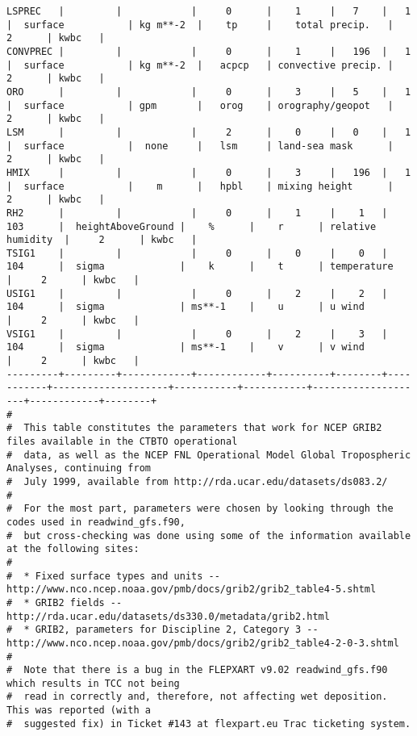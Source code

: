\documentclass{egu}                  %
\begin{document}
\begin{landscape}
\begin{scriptsize}
\begin{verbatim}
LSPREC   |         |            |     0      |    1     |   7    |   1       |  surface           | kg m**-2  |    tp     |    total precip.   |     2      | kwbc   |
CONVPREC |         |            |     0      |    1     |   196  |   1       |  surface           | kg m**-2  |   acpcp   | convective precip. |     2      | kwbc   |
ORO      |         |            |     0      |    3     |   5    |   1       |  surface           | gpm       |   orog    | orography/geopot   |     2      | kwbc   |
LSM      |         |            |     2      |    0     |   0    |   1       |  surface           |  none     |   lsm     | land-sea mask      |     2      | kwbc   |
HMIX     |         |            |     0      |    3     |   196  |   1       |  surface           |    m      |   hpbl    | mixing height      |     2      | kwbc   |
RH2      |         |            |     0      |    1     |    1   |  103      |  heightAboveGround |    %      |    r      | relative humidity  |     2      | kwbc   |
TSIG1    |         |            |     0      |    0     |    0   |  104      |  sigma             |    k      |    t      | temperature        |     2      | kwbc   |
USIG1    |         |            |     0      |    2     |    2   |  104      |  sigma             | ms**-1    |    u      | u wind             |     2      | kwbc   |
VSIG1    |         |            |     0      |    2     |    3   |  104      |  sigma             | ms**-1    |    v      | v wind             |     2      | kwbc   |
---------+---------+------------+------------+----------+--------+-----------+--------------------+-----------+-----------+--------------------+------------+--------+
#
#  This table constitutes the parameters that work for NCEP GRIB2 files available in the CTBTO operational
#  data, as well as the NCEP FNL Operational Model Global Tropospheric Analyses, continuing from
#  July 1999, available from http://rda.ucar.edu/datasets/ds083.2/
#
#  For the most part, parameters were chosen by looking through the codes used in readwind_gfs.f90,
#  but cross-checking was done using some of the information available at the following sites:
#
#  * Fixed surface types and units -- http://www.nco.ncep.noaa.gov/pmb/docs/grib2/grib2_table4-5.shtml
#  * GRIB2 fields -- http://rda.ucar.edu/datasets/ds330.0/metadata/grib2.html
#  * GRIB2, parameters for Discipline 2, Category 3 -- http://www.nco.ncep.noaa.gov/pmb/docs/grib2/grib2_table4-2-0-3.shtml
#
#  Note that there is a bug in the FLEPXART v9.02 readwind_gfs.f90 which results in TCC not being
#  read in correctly and, therefore, not affecting wet deposition.  This was reported (with a
#  suggested fix) in Ticket #143 at flexpart.eu Trac ticketing system.
\end{verbatim}\end{scriptsize}

\end{landscape} 
\end{document}
